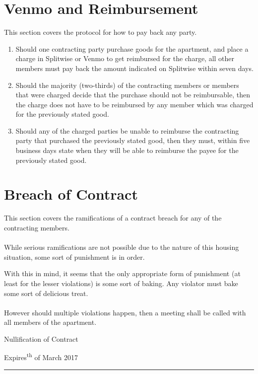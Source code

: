 \documentclass[10pt]{article}
\newcommand{\dateNullification}{25\textsuperscript {th} of March 2017}
\begin{document}
\section{Venmo and Reimbursement} \label{Venmo and Reinbursement}
This section covers the protocol for how to pay back any party.
\begin{enumerate}
	\item Should one contracting party purchase goods for the apartment, and place a charge in Splitwise or Venmo to get reimbursed for the charge, all other members must pay back the amount indicated on Splitwise within seven days.
	\item Should the majority (two-thirds) of the contracting members or members that were charged decide that the purchase should not be reimbursable, then the charge does not have to be reimbursed by any member which was charged for the previously stated good.
	\item Should any of the charged parties be unable to reimburse the contracting party that purchased the previously stated good, then they must, within five business days state when they will be able to reimburse the payee for the previously stated good.
	
\end{enumerate}

\section{Breach of Contract} \label{Breach of Contract}
This section covers the ramifications of a contract breach for any of the contracting members.
\\\\
While serious ramifications are not possible due to the nature of this housing situation, some sort of punishment is in order.

With this in mind, it seems that the only appropriate form of punishment (at least for the lesser violations) is some sort of baking. Any violator must bake some sort of delicious treat.
\\\\
However should multiple violations happen, then a meeting shall be called with all members of the apartment.


\newpage
\begin{center}
	{\Large Nullification of Contract}
\end{center}
\begin{center}
	{\normalsize Expires\space\dateNullification}
\end{center}
\hrule height .1mm
\end{document}
